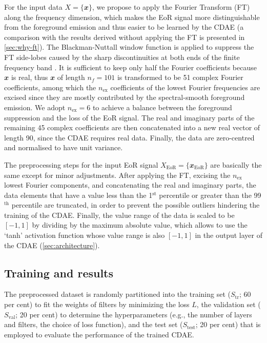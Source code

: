 \documentclass[letters,fleqn,usenatbib]{mnras}
\newcommand{\R}[1]{\mathrm{#1}}
\newcommand{\B}[1]{\mathbfit{#1}}
\begin{document}
For the input data $X = \{\B{x}\}$, we propose to apply the
Fourier Transform (FT) along the frequency dimension,
which makes the EoR signal more distinguishable from the
foreground emission and thus easier to be learned by the CDAE
(a comparison with the results derived without applying the FT is
presented in \autoref{sec:why-ft}).
The Blackman-Nuttall window function is applied to suppress the
FT side-lobes caused by the sharp discontinuities at both ends
of the finite frequency band \citep[e.g.,][]{chapman2016}.
It is sufficient to keep only half the Fourier coefficients because
$\B{x}$ is real, thus $\B{x}$ of length $n_f = 101$ is transformed to
be 51 complex Fourier coefficients, among which the $n_{\R{ex}}$
coefficients of the lowest Fourier frequencies are excised since they
are mostly contributed by the spectral-smooth foreground emission.
We adopt $n_{\R{ex}} = 6$ to achieve a balance between the foreground
suppression and the loss of the EoR signal.
The real and imaginary parts of the remaining 45 complex coefficients
are then concatenated into a new real vector of length 90, since the CDAE
requires real data.
Finally, the data are zero-centred and normalised to have unit variance.

The preprocessing steps for the input EoR signal
$X_{\R{EoR}} = \{\B{x}_{\R{EoR}}\}$
are basically the same except for minor adjustments.
After applying the FT, excising the $n_{\R{ex}}$ lowest Fourier
components, and concatenating the real and imaginary parts,
the data elements that have a value less than the 1$^{\R{st}}$
percentile or greater than the 99$^{\R{th}}$ percentile are truncated,
in order to prevent the possible outliers hindering the training of
the CDAE.
Finally, the value range of the data is scaled to be $[-1, 1]$ by
dividing by the maximum absolute value,
which allows to use the `tanh' activation function whose value range
is also $[-1, 1]$ in the output layer of the CDAE
(\autoref{sec:architecture}).


\subsection{Training and results}
\label{sec:training}

The preprocessed dataset is randomly partitioned into
the training set ($S_{\R{tr}}$; 60 per cent) to fit the weights of
filters by minimizing the loss $L$,
the validation set ($S_{\R{val}}$; 20 per cent) to determine the
hyperparameters (e.g., the number of layers and filters, the choice of
loss function),
and the test set ($S_{\R{test}}$; 20 per cent) that is employed to
evaluate the performance of the trained CDAE.
\end{document}

